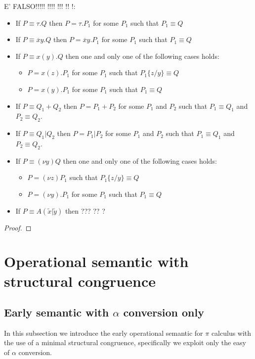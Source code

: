 \begin{lemma}
  E' FALSO!!!!! !!!! !!! !! !:\begin{itemize}
    \item
      If $P\equiv \tau.Q$ then $P=\tau.P_{1}$ for some $P_{1}$ such that $P_{1}\equiv Q$
    \item
      If $P\equiv \overline{x}y.Q$ then $P=\overline{x}y.P_{1}$ for some $P_{1}$ such that $P_{1}\equiv Q$
    \item
      If $P\equiv x(y).Q$ then one and only one of the following cases holds:
      \begin{itemize}
	\item 
	  $P=x(z).P_{1}$ for some $P_{1}$ such that $P_{1}\{z/y\}\equiv Q$
	\item
	  $P=x(y).P_{1}$ for some $P_{1}$ such that $P_{1}\equiv Q$
      \end{itemize}
    \item
      If $P\equiv Q_{1}+Q_{2}$ then $P=P_{1}+P_{2}$ for some $P_{1}$ and $P_{2}$ such that $P_{1}\equiv Q_{1}$ and $P_{2}\equiv Q_{2}$.
    \item 
      If $P\equiv Q_{1}|Q_{2}$ then $P=P_{1}|P_{2}$ for some $P_{1}$ and $P_{2}$ such that $P_{1}\equiv Q_{1}$ and $P_{2}\equiv Q_{2}$.
    \item 
      If $P\equiv (\nu y)Q$ then one and only one of the following cases holds:
      \begin{itemize}
        \item 
	  $P=(\nu z)P_{1}$ such that $P_{1}\{z/y\}\equiv Q$
	\item
	  $P=(\nu y).P_{1}$ for some $P_{1}$ such that $P_{1}\equiv Q$
      \end{itemize}
    \item 
      If $P\equiv A(\tilde{x}|\tilde{y})$ then ??? ?? ?
  \end{itemize}
  \begin{proof}
    
  \end{proof}
\end{lemma}


\section{Operational semantic with structural congruence}

\subsection{Early semantic with $\alpha$ conversion only}
In this subsection we introduce the early operational semantic for $\pi$ calculus with the use of a minimal structural congruence, specifically we exploit only the easy of $\alpha$ conversion.

